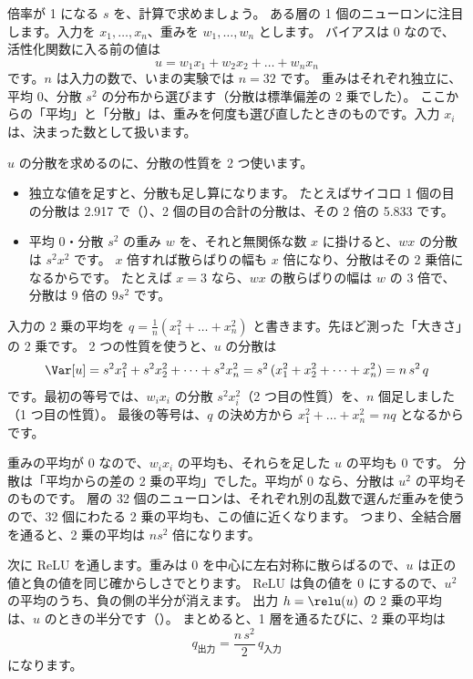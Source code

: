 倍率が 1 になる $s$ を、計算で求めましょう。
ある層の 1 個のニューロンに注目します。入力を $x_1,\dots,x_n$、重みを $w_1,\dots,w_n$ とします。
バイアスは 0 なので、活性化関数に入る前の値は
\[ u=w_1x_1+w_2x_2+\dots+w_nx_n \]
です。$n$ は入力の数で、いまの実験では $n=32$ です。
重みはそれぞれ独立に、平均 0、分散 $s^2$ の分布から選びます（分散は標準偏差の 2 乗でした）。
ここからの「平均」と「分散」は、重みを何度も選び直したときのものです。入力 $x_i$ は、決まった数として扱います。

$u$ の分散を求めるのに、分散の性質を 2 つ使います。
\begin{itemize}
\item 独立な値を足すと、分散も足し算になります。
たとえばサイコロ 1 個の目の分散は 2.917 で（）、2 個の目の合計の分散は、その 2 倍の 5.833 です。
\item 平均 0・分散 $s^2$ の重み $w$ を、それと無関係な数 $x$ に掛けると、$wx$ の分散は $s^2x^2$ です。
$x$ 倍すれば散らばりの幅も $x$ 倍になり、分散はその 2 乗倍になるからです。
たとえば $x=3$ なら、$wx$ の散らばりの幅は $w$ の 3 倍で、分散は 9 倍の $9s^2$ です。
\end{itemize}
入力の 2 乗の平均を $q=\frac{1}{n}(x_1^2+\dots+x_n^2)$ と書きます。先ほど測った「大きさ」の 2 乗です。
2 つの性質を使うと、$u$ の分散は
\begin{equation}
\Var[u]=s^2x_1^2+s^2x_2^2+\dots+s^2x_n^2=s^2\,(x_1^2+x_2^2+\dots+x_n^2)=n\,s^2\,q
\label{eq:training-var-u}
\end{equation}
です。最初の等号では、$w_ix_i$ の分散 $s^2x_i^2$（2 つ目の性質）を、$n$ 個足しました（1 つ目の性質）。
最後の等号は、$q$ の決め方から $x_1^2+\dots+x_n^2=nq$ となるからです。

重みの平均が 0 なので、$w_ix_i$ の平均も、それらを足した $u$ の平均も 0 です。
分散は「平均からの差の 2 乗の平均」でした。平均が 0 なら、分散は $u^2$ の平均そのものです。
層の 32 個のニューロンは、それぞれ別の乱数で選んだ重みを使うので、32 個にわたる 2 乗の平均も、この値に近くなります。
つまり、全結合層を通ると、2 乗の平均は $n s^2$ 倍になります。

次に ReLU を通します。重みは 0 を中心に左右対称に散らばるので、$u$ は正の値と負の値を同じ確からしさでとります。
ReLU は負の値を 0 にするので、$u^2$ の平均のうち、負の側の半分が消えます。
出力 $h=\relu(u)$ の 2 乗の平均は、$u$ のときの半分です（）。
まとめると、1 層を通るたびに、2 乗の平均は
\begin{equation}
q_{\text{出力}}=\frac{n\,s^2}{2}\,q_{\text{入力}}
\label{eq:training-var-layer}
\end{equation}
になります。

